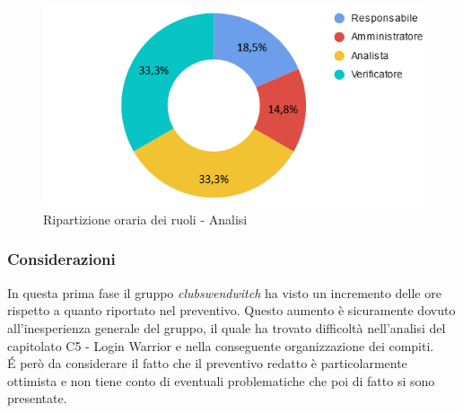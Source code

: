 \begin{figure}[h!]
	\centering
	\includegraphics[scale=0.70]{../../assets/Diagrammi_Excel/torta_ore_Analisi.png}
	\caption{Ripartizione oraria dei ruoli - Analisi}
\end{figure}

\subsubsection{Considerazioni}
In questa prima fase il gruppo \textit{clubswendwitch} ha visto un incremento delle ore rispetto a quanto riportato nel preventivo. Questo aumento è sicuramente dovuto all'inesperienza generale del gruppo, il quale ha trovato difficoltà nell'analisi del capitolato C5 - Login Warrior e nella conseguente organizzazione dei compiti.\\
\'E però da considerare il fatto che il preventivo redatto è particolarmente ottimista e non tiene conto di eventuali problematiche che poi di fatto si sono presentate.

